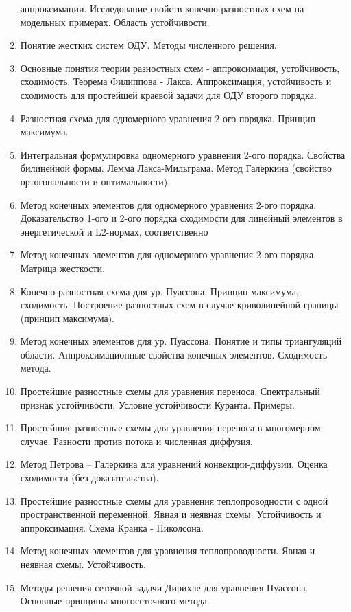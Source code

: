 \documentclass[a4paper]{article}
\begin{document}
\begin{enumerate}
  аппроксимации. Исследование свойств конечно-разностных схем на
  модельных примерах. Область устойчивости.
\item Понятие жестких систем ОДУ. Методы численного решения.
\item Основные понятия теории разностных схем - аппроксимация,
  устойчивость, сходимость. Теорема Филиппова - Лакса. Аппроксимация,
  устойчивость и сходимость для простейшей краевой задачи для ОДУ
  второго порядка.
\item Разностная схема для одномерного уравнения 2-ого
  порядка. Принцип максимума.
\item Интегральная формулировка одномерного уравнения 2-ого
  порядка. Свойства билинейной формы. Лемма Лакса-Мильграма. Метод
  Галеркина (свойство ортогональности и оптимальности).
\item Метод конечных элементов для одномерного уравнения 2-ого
  порядка. Доказательство 1-ого и 2-ого порядка сходимости для
  линейный элементов в энергетической и L2-нормах, соответственно
\item Метод конечных элементов для одномерного уравнения 2-ого
  порядка. Матрица жесткости.
\item Конечно-разностная схема для ур. Пуассона. Принцип максимума,
  сходимость. Построение разностных схем в случае криволинейной
  границы (принцип максимума).
\item Метод конечных элементов для ур. Пуассона. Понятие и типы
  триангуляций области. Аппроксимационные свойства конечных
  элементов. Сходимость метода.
\item Простейшие разностные схемы для уравнения переноса. Спектральный
  признак устойчивости. Условие устойчивости Куранта.  Примеры.
\item Простейшие разностные схемы для уравнения переноса в многомерном
  случае. Разности против потока и численная диффузия.
\item Метод Петрова – Галеркина для уравнений
  конвекции-диффузии. Оценка сходимости (без доказательства).
\item Простейшие разностные схемы для уравнения теплопроводности с
  одной пространственной переменной. Явная и неявная
  схемы. Устойчивость и аппроксимация. Схема Кранка - Николсона.
\item Метод конечных элементов для уравнения теплопроводности. Явная и
  неявная схемы. Устойчивость.
\item Методы решения сеточной задачи Дирихле для уравнения
  Пуассона. Основные принципы многосеточного метода.
\end{enumerate}
\medskip
\dmvntrail
\end{document}
